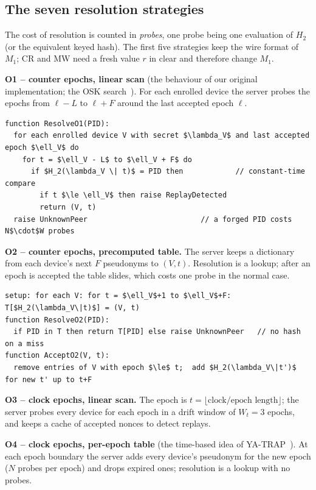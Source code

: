 \subsection*{The seven resolution strategies}
The cost of resolution is counted in \emph{probes}, one probe being one evaluation of $H_2$ (or the equivalent keyed hash). The first five strategies keep the wire format of $M_1$; CR and MW need a fresh value $r$ in clear and therefore change $M_1$.

\textbf{O1 -- counter epochs, linear scan} (the behaviour of our original implementation; the OSK search~\cite{ohkubo}). For each enrolled device the server probes the epochs from $\ell-L$ to $\ell+F$ around the last accepted epoch $\ell$.
\begin{lstlisting}[style=pseudo]
function ResolveO1(PID):
  for each enrolled device V with secret $\lambda_V$ and last accepted epoch $\ell_V$ do
    for t = $\ell_V - L$ to $\ell_V + F$ do
      if $H_2(\lambda_V \| t)$ = PID then            // constant-time compare
        if t $\le \ell_V$ then raise ReplayDetected
        return (V, t)
  raise UnknownPeer                          // a forged PID costs N$\cdot$W probes
\end{lstlisting}

\textbf{O2 -- counter epochs, precomputed table.} The server keeps a dictionary from each device's next $F$ pseudonyms to $(V,t)$. Resolution is a lookup; after an epoch is accepted the table slides, which costs one probe in the normal case.
\begin{lstlisting}[style=pseudo]
setup: for each V: for t = $\ell_V$+1 to $\ell_V$+F: T[$H_2(\lambda_V\|t)$] = (V, t)
function ResolveO2(PID):
  if PID in T then return T[PID] else raise UnknownPeer   // no hash on a miss
function AcceptO2(V, t):
  remove entries of V with epoch $\le$ t;  add $H_2(\lambda_V\|t')$ for new t' up to t+F
\end{lstlisting}

\textbf{O3 -- clock epochs, linear scan.} The epoch is $t=\lfloor\text{clock}/\text{epoch length}\rfloor$; the server probes every device for each epoch in a drift window of $W_t=3$ epochs, and keeps a cache of accepted nonces to detect replays.

\textbf{O4 -- clock epochs, per-epoch table} (the time-based idea of YA-TRAP~\cite{tsudik}). At each epoch boundary the server adds every device's pseudonym for the new epoch ($N$ probes per epoch) and drops expired ones; resolution is a lookup with no probes.

